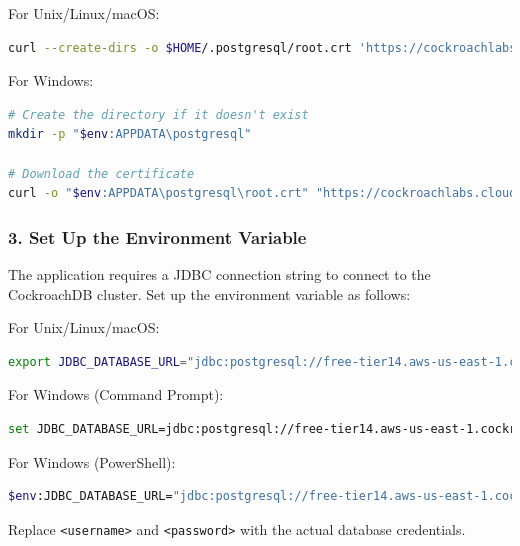 \documentclass[twoside]{article}
\begin{document}
For Unix/Linux/macOS:
\begin{lstlisting}[language=bash, caption=Downloading Certificate on Unix/Linux/macOS]
curl --create-dirs -o $HOME/.postgresql/root.crt 'https://cockroachlabs.cloud/clusters/690e5a03-c6aa-48d5-82b8-60ec652e68f7/cert'
\end{lstlisting}

For Windows:
\begin{lstlisting}[language=bash, caption=Downloading Certificate on Windows]
# Create the directory if it doesn't exist
mkdir -p "$env:APPDATA\postgresql"

# Download the certificate
curl -o "$env:APPDATA\postgresql\root.crt" "https://cockroachlabs.cloud/clusters/690e5a03-c6aa-48d5-82b8-60ec652e68f7/cert"
\end{lstlisting}

\subsubsection{3. Set Up the Environment Variable}

The application requires a JDBC connection string to connect to the CockroachDB cluster. Set up the environment variable as follows:

For Unix/Linux/macOS:
\begin{lstlisting}[language=bash, caption=Setting Environment Variable on Unix/Linux/macOS]
export JDBC_DATABASE_URL="jdbc:postgresql://free-tier14.aws-us-east-1.cockroachlabs.cloud:26257/defaultdb?sslmode=verify-full&user=<username>&password=<password>"
\end{lstlisting}

For Windows (Command Prompt):
\begin{lstlisting}[language=bash, caption=Setting Environment Variable on Windows (CMD)]
set JDBC_DATABASE_URL=jdbc:postgresql://free-tier14.aws-us-east-1.cockroachlabs.cloud:26257/defaultdb?sslmode=verify-full&user=<username>&password=<password>
\end{lstlisting}

For Windows (PowerShell):
\begin{lstlisting}[language=bash, caption=Setting Environment Variable on Windows (PowerShell)]
$env:JDBC_DATABASE_URL="jdbc:postgresql://free-tier14.aws-us-east-1.cockroachlabs.cloud:26257/defaultdb?sslmode=verify-full&user=<username>&password=<password>"
\end{lstlisting}

Replace \texttt{<username>} and \texttt{<password>} with the actual database credentials.
\end{document}
